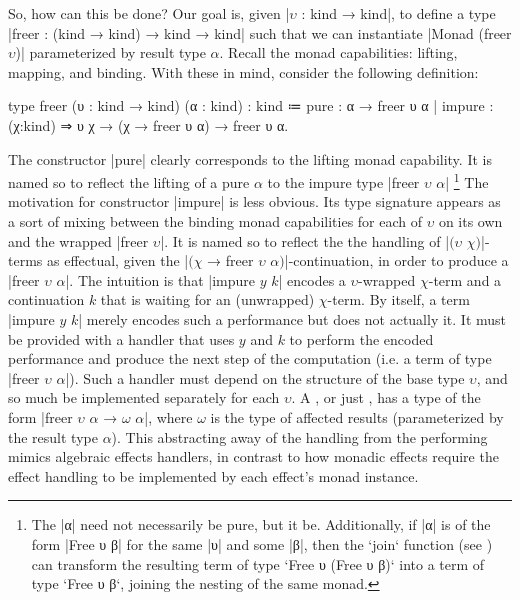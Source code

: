 So, how can this be done?
Our goal is, given \code|$υ$ : kind → kind|, to define a type \code|freer : (kind → kind) → kind → kind| such that we can instantiate \code|Monad (freer $υ$)| parameterized by result type $α$.
Recall the monad capabilities: lifting, mapping, and binding.
With these in mind, consider the following definition:
\begin{program}[caption={Definition of \code|freer|}]
type freer (υ : kind → kind) (α : kind) : kind
  ≔ pure   : α → freer υ α
  | impure : (χ:kind) ⇒ υ χ → (χ → freer υ α) → freer υ α.
\end{program}
The constructor \code|pure| clearly corresponds to the lifting monad capability.
It is named so to reflect the lifting of a pure $α$ to the impure type \code|freer $υ$ $α$|%
\footnote{
  The \code|α| need not necessarily be pure, but it  be.
  Additionally, if \code|α| is of the form \code|Free υ β| for the same \code|υ| and some \code|β|,
  then the \code`join` function (see \prelude\LangC) can transform the resulting term of type \code`Free υ (Free υ β)` into a term of type \code`Free υ β`,
  joining the nesting of the same monad.
}
The motivation for constructor \code|impure| is less obvious.
Its type signature appears as a sort of mixing between the binding monad capabilities for each of $υ$ on its own and the wrapped \code|freer $υ$|.
It is named so to reflect the the handling of \code|$($$υ$ $χ$$)$|-terms as effectual, given the \code|$($$χ$ → freer $υ$ $α$$)$|-continuation, in order to produce a \code|freer $υ$ $α$|.
The intuition is that \code|impure $y$ $k$| encodes a $υ$-wrapped $χ$-term and a continuation $k$ that is waiting for an (unwrapped) $χ$-term.
By itself, a term \code|impure $y$ $k$| merely encodes such a performance but does not actually  it.
It must be provided with a handler that uses $y$ and $k$ to perform the encoded performance and produce the next step of the computation (i.e. a term of type \code|freer $υ$ $α$|).
Such a handler must depend on the structure of the base type $υ$, and so much be implemented separately for each $υ$.
A , or just , has a type of the form \code|freer $υ$ $α$ → $ω$ $α$|, where $ω$ is the type of affected results (parameterized by the result type $α$).
This abstracting away of the handling from the performing mimics algebraic effects handlers, in contrast to how monadic effects require the effect handling to be implemented by each effect's monad instance.

